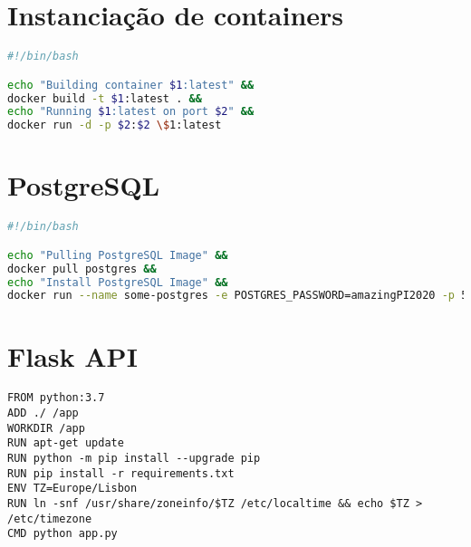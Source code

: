 
\chapter{Instanciação de containers}
\label{app:deploybash}
\begin{lstlisting}[language=bash,caption={Script de instânciação de containers},breaklines=true,label={code:postgre}]
#!/bin/bash

echo "Building container $1:latest" &&
docker build -t $1:latest . &&
echo "Running $1:latest on port $2" &&
docker run -d -p $2:$2 \$1:latest
\end{lstlisting}

\chapter{PostgreSQL}
\label{app:postgre}
\begin{lstlisting}[language=bash,caption={Script de instalação de PostgreSQL},breaklines=true,label={code:postgre}]
#!/bin/bash

echo "Pulling PostgreSQL Image" &&
docker pull postgres &&
echo "Install PostgreSQL Image" &&
docker run --name some-postgres -e POSTGRES_PASSWORD=amazingPI2020 -p 5432:5432 -d postgres
\end{lstlisting}

\chapter{Flask API}
\label{app:flask}
\begin{lstlisting}[language=docker,caption={Flask Dockerfile},breaklines=true,label={code:flask}]
FROM python:3.7
ADD ./ /app
WORKDIR /app
RUN apt-get update
RUN python -m pip install --upgrade pip
RUN pip install -r requirements.txt
ENV TZ=Europe/Lisbon
RUN ln -snf /usr/share/zoneinfo/$TZ /etc/localtime && echo $TZ > /etc/timezone
CMD python app.py
\end{lstlisting}

